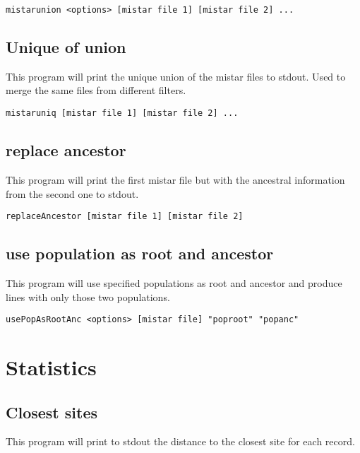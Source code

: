 \documentclass[a4paper]{article}
\begin{document}
\begin{verbatim}
mistarunion <options> [mistar file 1] [mistar file 2] ...
\end{verbatim}


\subsection{Unique of union}

This program will print the unique union of the mistar files to stdout. Used to merge the same files from different filters.

\begin{verbatim}
mistaruniq [mistar file 1] [mistar file 2] ...
\end{verbatim}


\subsection{replace ancestor}

This program will print the first mistar file but with the ancestral information from the second one to stdout.

\begin{verbatim}
replaceAncestor [mistar file 1] [mistar file 2]
\end{verbatim}


\subsection{use population as root and ancestor}

This program will use specified populations as root and ancestor and produce lines with only those two populations.

\begin{verbatim}
usePopAsRootAnc <options> [mistar file] "poproot" "popanc"
\end{verbatim}



\section{Statistics}

\subsection{Closest sites}

This program will print to stdout the distance to the closest site for each record.
\end{document}
